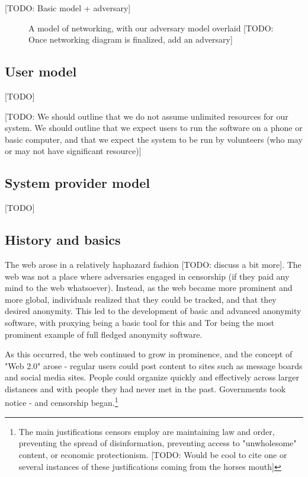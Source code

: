 \documentclass[12pt]{report}
\begin{document}
[TODO: Basic model + adversary]

\begin{figure}
\begin{center}
{}
\end{center}
\caption[Basic networking, with an adversary]{A model of networking, with our adversary model overlaid [TODO: Once networking diagram is finalized, add an adversary]}
\end{figure}

\subsection{User model}

[TODO]

[TODO: We should outline that we do not assume unlimited resources for our system. We should outline that we expect users to run the software on a phone or basic computer, and that we expect the system to be run by volunteers (who may or may not have significant resource)]

\subsection{System provider model}

[TODO]

\subsection{History and basics}

The web arose in a relatively haphazard fashion [TODO: discuss a bit more]. The web was not a place where adversaries engaged in censorship (if they paid any mind to the web whatsoever). Instead, as the web became more prominent and more global, individuals realized that they could be tracked, and that they desired anonymity. This led to the development of basic and advanced anonymity software, with proxying being a basic tool for this and Tor being the most prominent example of full fledged anonymity software.

As this occurred, the web continued to grow in prominence, and the concept of "Web 2.0" arose - regular users could post content to sites such as message boards and social media sites. People could organize quickly and effectively across larger distances and with people they had never met in the past. Governments took notice - and censorship began.\footnote{The main justifications censors employ are maintaining law and order, preventing the spread of disinformation, preventing access to "unwholesome" content, or economic protectionism. [TODO: Would be cool to cite one or several instances of these justifications coming from the horses mouth]}
\end{document}
